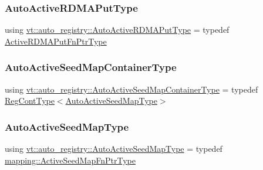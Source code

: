 \mbox{\label{namespacevt_1_1auto__registry_a1f67d3efa37b61040b56258ca59df088}} 
\subsubsection{\texorpdfstring{Auto\+Active\+R\+D\+M\+A\+Put\+Type}{AutoActiveRDMAPutType}}
{\footnotesize\ttfamily using \hyperlink{namespacevt_1_1auto__registry_a1f67d3efa37b61040b56258ca59df088}{vt\+::auto\+\_\+registry\+::\+Auto\+Active\+R\+D\+M\+A\+Put\+Type} = typedef \hyperlink{namespacevt_a23220eaaee4345f7371d35e3aee23c70}{Active\+R\+D\+M\+A\+Put\+Fn\+Ptr\+Type}}

\mbox{\label{namespacevt_1_1auto__registry_ab66be9508a849981974eb0c5f9909ff4}} 
\subsubsection{\texorpdfstring{Auto\+Active\+Seed\+Map\+Container\+Type}{AutoActiveSeedMapContainerType}}
{\footnotesize\ttfamily using \hyperlink{namespacevt_1_1auto__registry_ab66be9508a849981974eb0c5f9909ff4}{vt\+::auto\+\_\+registry\+::\+Auto\+Active\+Seed\+Map\+Container\+Type} = typedef \hyperlink{namespacevt_1_1auto__registry_a988a4943e4c8fe82b56f5b13bddceb2b}{Reg\+Cont\+Type}$<$\hyperlink{namespacevt_1_1auto__registry_a9b5f3bdf0a9a503806cfd4f2747c82f6}{Auto\+Active\+Seed\+Map\+Type}$>$}

\mbox{\label{namespacevt_1_1auto__registry_a9b5f3bdf0a9a503806cfd4f2747c82f6}} 
\subsubsection{\texorpdfstring{Auto\+Active\+Seed\+Map\+Type}{AutoActiveSeedMapType}}
{\footnotesize\ttfamily using \hyperlink{namespacevt_1_1auto__registry_a9b5f3bdf0a9a503806cfd4f2747c82f6}{vt\+::auto\+\_\+registry\+::\+Auto\+Active\+Seed\+Map\+Type} = typedef \hyperlink{namespacevt_1_1mapping_a254b50d55be91c3bd002481b2e96da7e}{mapping\+::\+Active\+Seed\+Map\+Fn\+Ptr\+Type}}

